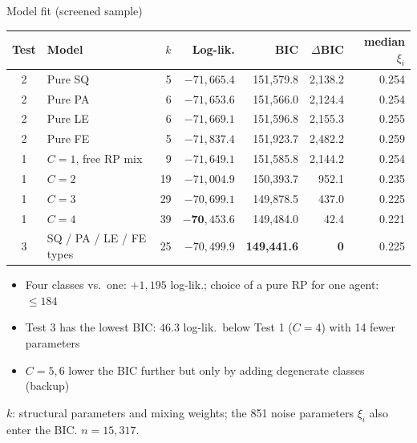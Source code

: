 \documentclass[aspectratio=169,11pt]{beamer}
\newcommand{\tabnote}[1]{\par\vfill{\scriptsize\color{muted}#1\par}}
\newcommand{\tight}{\setlength{\itemsep}{3pt}}
\begin{document}
\begin{frame}{Model fit (screened sample)}
{\centering\footnotesize
\begin{tabular}{cl rrrrr}
\toprule
Test & Model & $k$ & Log-lik. & BIC & $\Delta$BIC & median $\xi_i$\\
\midrule
2 & Pure SQ & 5 & $-71{,}665.4$ & 151{,}579.8 & 2{,}138.2 & 0.254\\
2 & Pure PA & 6 & $-71{,}653.6$ & 151{,}566.0 & 2{,}124.4 & 0.254\\
2 & Pure LE & 6 & $-71{,}669.1$ & 151{,}596.8 & 2{,}155.3 & 0.255\\
2 & Pure FE & 5 & $-71{,}837.4$ & 151{,}923.7 & 2{,}482.2 & 0.259\\
\midrule
1 & $C=1$, free RP mix & 9 & $-71{,}649.1$ & 151{,}585.8 & 2{,}144.2 & 0.254\\
1 & $C=2$ & 19 & $-71{,}004.9$ & 150{,}393.7 & 952.1 & 0.235\\
1 & $C=3$ & 29 & $-70{,}699.1$ & 149{,}878.5 & 437.0 & 0.225\\
1 & $C=4$ & 39 & $\mathbf{-70{,}453.6}$ & 149{,}484.0 & 42.4 & 0.221\\
\midrule
3 & SQ / PA / LE / FE types & 25 & $-70{,}499.9$ & \textbf{149{,}441.6} & \textbf{0} & 0.225\\
\bottomrule
\end{tabular}\par}
\begin{itemize}\small\tight
  \item Four classes vs.\ one: $+1{,}195$ log-lik.; choice of a pure RP for one agent: $\le 184$
  \item Test 3 has the lowest BIC: $46.3$ log-lik.\ below Test 1 ($C=4$) with 14 fewer parameters
  \item $C=5,6$ lower the BIC further but only by adding degenerate classes (backup)
\end{itemize}
\tabnote{$k$: structural parameters and mixing weights; the 851 noise parameters $\xi_i$ also enter the BIC. $n=15{,}317$.}
\end{frame}
\end{document}
